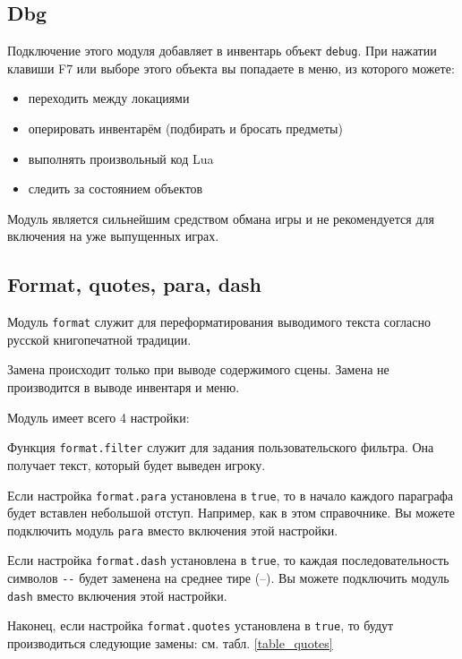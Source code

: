 \documentclass[12pt]{article}
\begin{document}
\subsection{Dbg}

Подключение этого модуля добавляет в инвентарь объект \verb/debug/. При нажатии клавиши F7 или выборе этого объекта вы попадаете в меню, из которого можете:

\begin{itemize}
 \item переходить между локациями
 \item оперировать инвентарём (подбирать и бросать предметы)
 \item выполнять произвольный код Lua
 \item следить за состоянием объектов
\end{itemize}

Модуль является сильнейшим средством обмана игры и не рекомендуется для включения на уже выпущенных играх.

\subsection{Format, quotes, para, dash}

Модуль \verb/format/ служит для переформатирования выводимого текста согласно русской книгопечатной традиции.

Замена происходит только при выводе содержимого сцены. Замена не производится в выводе инвентаря и меню.

Модуль имеет всего 4 настройки:

Функция \verb/format.filter/ служит для задания пользовательского фильтра. Она получает текст, который будет выведен игроку.

Если настройка \verb/format.para/ установлена в \verb/true/, то в начало каждого параграфа будет вставлен небольшой отступ. Например, как в этом справочнике. Вы можете подключить модуль \verb/para/ вместо включения этой настройки.

Если настройка \verb/format.dash/ установлена в \verb/true/, то каждая последовательность символов \verb/--/ будет заменена на среднее тире (--). Вы можете подключить модуль \verb/dash/ вместо включения этой настройки.

Наконец, если настройка \verb/format.quotes/ установлена в \verb/true/, то будут производиться следующие замены: см. табл. \ref{table_quotes}
\end{document}
